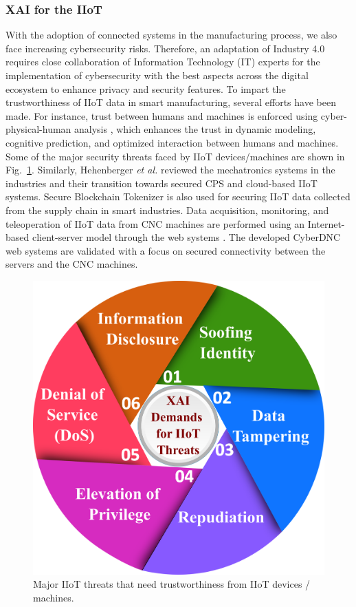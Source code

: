 \documentclass[journal]{IEEEtran}
\begin{document}
\subsubsection{XAI for the IIoT}
With the adoption of connected systems in the manufacturing process, we also face increasing cybersecurity risks. Therefore, an adaptation of Industry 4.0 requires close collaboration of Information Technology (IT) experts for the implementation of cybersecurity with the best aspects across the digital ecosystem to enhance privacy and security features. To impart the trustworthiness of IIoT data in smart manufacturing, several efforts have been made. For instance, trust between humans and machines is enforced using cyber-physical-human analysis \cite{jiao_towards_2020}, which enhances the trust in dynamic modeling, cognitive prediction, and optimized interaction between humans and machines. Some of the major security threats faced by IIoT devices/machines are shown in Fig.~\ref{fig:IIoTthreats}. Similarly, Hehenberger \textit{et al.}\cite{hehenberger_design_2016} reviewed the mechatronics systems in the industries and their transition towards secured CPS and cloud-based IIoT systems. Secure Blockchain Tokenizer is also used for securing IIoT data collected from the supply chain in smart industries\cite{mazzei_blockchain_2020}. Data acquisition, monitoring, and teleoperation of IIoT data from CNC machines are performed using an Internet-based client-server model through the web systems \cite{alvares_development_2018}. The developed CyberDNC web systems are validated with a focus on secured connectivity between the servers and the CNC machines.  
\begin{figure}[t]
  \centering    
  \includegraphics[width=0.95\linewidth]{figures/IIoTthreats.png}
  \caption{Major IIoT threats that need trustworthiness from IIoT devices / machines.}
     \label{fig:IIoTthreats}
\end{figure}
\end{document}

